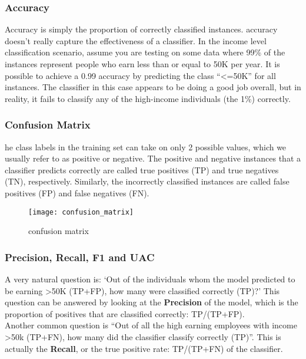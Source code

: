 
\subsubsection{Accuracy}
Accuracy is simply the proportion of correctly classified instances. accuracy doesn’t really capture the effectiveness of a classifier. In the income level classification scenario, assume you are testing on some data where 99\% of the instances represent people who earn less than or equal to 50K per year. It is possible to achieve a 0.99 accuracy by predicting the class “<=50K” for all instances. The classifier in this case appears to be doing a good job overall, but in reality, it fails to classify any of the high-income individuals (the 1\%) correctly.

\subsubsection{Confusion Matrix}
he class labels in the training set can take on only 2 possible values, which we usually refer to as positive or negative. The positive and negative instances that a classifier predicts correctly are called true positives (TP) and true negatives (TN), respectively. Similarly, the incorrectly classified instances are called false positives (FP) and false negatives (FN). 

\begin{figure}[h]
\centering
\texttt{[image: confusion\_matrix]}
\caption{confusion matrix \protect\footnotemark{}}
\label{fig:confusion_matrix}
\end{figure}


\subsubsection{Precision, Recall, F1 and UAC}
A very natural question is: ‘Out of the individuals whom the model predicted to be earning >50K (TP+FP), how many were classified correctly (TP)?’ This question can be answered by looking at the \textbf{Precision} of the model, which is the proportion of positives that are classified correctly: TP/(TP+FP). \\

Another common question is “Out of all the high earning employees with income >50k (TP+FN), how many did the classifier classify correctly (TP)”. This is actually the \textbf{Recall}, or the true positive rate: TP/(TP+FN) of the classifier. \\

